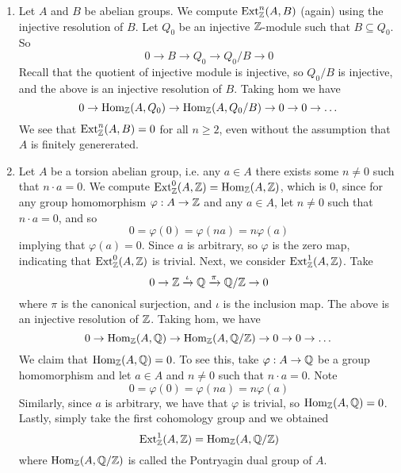\begin{ex}
    \hfill

    \begin{enumerate}
        \item Let $A$ and $B$ be abelian groups. We compute $\operatorname{Ext}_{\mathbb Z}^n(A,B)$ (again) using the injective resolution of $B$. Let $Q_0$ be an injective ${\mathbb Z}$-module such that $B\subseteq Q_0$. So
        \[0 \to B\to Q_0 \to Q_0/B \to 0\]
        Recall that the quotient of injective module is injective, so $Q_0/B$ is injective, and the above is an injective resolution of $B$. Taking hom we have 
        \[0 \to \operatorname{Hom}_{\mathbb Z}(A,Q_0) \to \operatorname{Hom}_{\mathbb Z}(A, Q_0/B) \to 0 \to 0 \to \dots\]
        We see that $\operatorname{Ext}_{\mathbb Z}^n(A,B)=0$ for all $n\geq 2$, even without the assumption that $A$ is finitely genererated.
        \item Let $A$ be a torsion abelian group, i.e. any $a\in A$ there exists some $n\neq 0$ such that $n\cdot a = 0$. We compute $\operatorname{Ext}_{\mathbb Z}^0(A,{\mathbb Z}) = \operatorname{Hom}_{\mathbb Z}(A,{\mathbb Z})$, which is $0$, since for any group homomorphism $\varphi:A\to {\mathbb Z}$ and any $a\in A$, let $n\neq 0$ such that $n\cdot a = 0$, and so 
        \[0 = \varphi(0) = \varphi(na) = n\varphi(a)\]
        implying that $\varphi(a)=0$. Since $a$ is arbitrary, so $\varphi$ is the zero map, indicating that $\operatorname{Ext}_{\mathbb Z}^0(A,{\mathbb Z})$ is trivial. Next, we consider $\operatorname{Ext}_{\mathbb Z}^1(A,{\mathbb Z})$. Take 
        \[0 \to {\mathbb Z} \xrightarrow{\iota} {\mathbb Q} \xrightarrow{\pi} {\mathbb Q}/{\mathbb Z} \to 0\]
        where $\pi$ is the canonical surjection, and $\iota$ is the inclusion map. The above is an injective resolution of ${\mathbb Z}$. Taking hom, we have 
        \[0 \to \operatorname{Hom}_{\mathbb Z}(A,{\mathbb Q})\to \operatorname{Hom}_{\mathbb Z}(A, {\mathbb Q}/{\mathbb Z}) \to 0 \to 0 \to \dots\]
        We claim that $\operatorname{Hom}_{\mathbb Z}(A,{\mathbb Q})=0$. To see this, take $\varphi:A\to {\mathbb Q}$ be a group homomorphism and let $a\in A$ and $n\neq 0$ such that $n\cdot a = 0$. Note
        \[0 = \varphi(0) = \varphi(na) = n\varphi(a)\]
        Similarly, since $a$ is arbitrary, we have that $\varphi$ is trivial, so $\operatorname{Hom}_{\mathbb Z}(A,{\mathbb Q})=0$. Lastly, simply take the first cohomology group and we obtained
        \[\operatorname{Ext}_{\mathbb Z}^1 (A,{\mathbb Z}) = \operatorname{Hom}_{\mathbb Z}(A,{\mathbb Q}/{\mathbb Z})\]
        where $\operatorname{Hom}_{\mathbb Z}(A,{\mathbb Q}/{\mathbb Z})$ is called the Pontryagin dual group of $A$.
    \end{enumerate}
\end{ex}

\medskip

